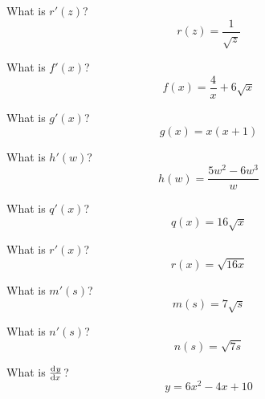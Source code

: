 \begin{ProblemSet}
 \begin{Problem}
  What is $r'(z)$?
  \begin{equation*}
   r(z) = \frac{1}{\sqrt{z}}
  \end{equation*}
 \end{Problem}

 \begin{Problem}
  What is $f'(x)$?
  \begin{equation*}
   f(x) = \frac{4}{x} + 6 \sqrt{x}
  \end{equation*}
 \end{Problem}

 \begin{Problem}
  What is $g'(x)$?
  \begin{equation*}
   g(x) = x (x + 1)
  \end{equation*}
 \end{Problem}

 \begin{Problem}
  What is $h'(w)$?
  \begin{equation*}
   h(w) = \frac{5 w^2 - 6 w^3}{w}
  \end{equation*}
 \end{Problem}

 \begin{Problem}
  What is $q'(x)$?
  \begin{equation*}
   q(x) = 16 \sqrt{x}
  \end{equation*}
 \end{Problem}

 \begin{Problem}
  What is $r'(x)$?
  \begin{equation*}
   r(x) = \sqrt{16 x}
  \end{equation*}
 \end{Problem}

 \begin{Problem}
  What is $m'(s)$?
  \begin{equation*}
   m(s) = 7 \sqrt{s}
  \end{equation*}
 \end{Problem}

 \begin{Problem}
  What is $n'(s)$?
  \begin{equation*}
   n(s) = \sqrt{7 s}
  \end{equation*}
 \end{Problem}

 \begin{Problem}
  What is $\frac{\mathrm{d}^{{}}y}{\mathrm{d} x^{{}}}$?
  \begin{equation*}
   y = 6 x^2 - 4 x + 10
  \end{equation*}
 \end{Problem}


\end{ProblemSet}
